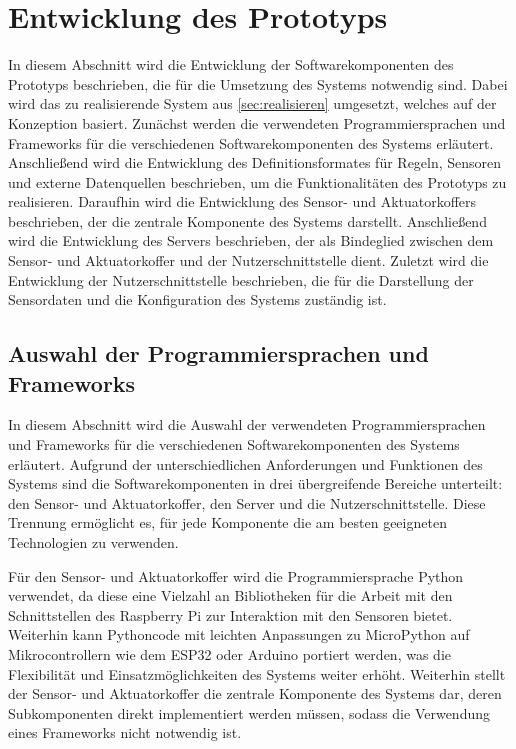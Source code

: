 \section{Entwicklung des Prototyps}\label{sec:programmierung}
In diesem Abschnitt wird die Entwicklung der Softwarekomponenten des Prototyps beschrieben, die für die Umsetzung des Systems notwendig sind.
Dabei wird das zu realisierende System aus \cref{sec:realisieren} umgesetzt, welches auf der Konzeption basiert.
Zunächst werden die verwendeten Programmiersprachen und Frameworks für die verschiedenen Softwarekomponenten des Systems erläutert.
Anschließend wird die Entwicklung des Definitionsformates für Regeln, Sensoren und externe Datenquellen beschrieben, um die Funktionalitäten des Prototyps zu realisieren.
Daraufhin wird die Entwicklung des Sensor- und Aktuatorkoffers beschrieben, der die zentrale Komponente des Systems darstellt.
Anschließend wird die Entwicklung des Servers beschrieben, der als Bindeglied zwischen dem Sensor- und Aktuatorkoffer und der Nutzerschnittstelle dient.
Zuletzt wird die Entwicklung der Nutzerschnittstelle beschrieben, die für die Darstellung der Sensordaten und die Konfiguration des Systems zuständig ist.


\subsection{Auswahl der Programmiersprachen und Frameworks}
In diesem Abschnitt wird die Auswahl der verwendeten Programmiersprachen und Frameworks für die verschiedenen Softwarekomponenten des Systems erläutert.
Aufgrund der unterschiedlichen Anforderungen und Funktionen des Systems sind die Softwarekomponenten in drei übergreifende Bereiche unterteilt: den Sensor- und Aktuatorkoffer, den Server und die Nutzerschnittstelle.
Diese Trennung ermöglicht es, für jede Komponente die am besten geeigneten Technologien zu verwenden.

Für den Sensor- und Aktuatorkoffer wird die Programmiersprache Python verwendet, da diese eine Vielzahl an Bibliotheken für die Arbeit mit den Schnittstellen des Raspberry Pi zur Interaktion mit den Sensoren bietet.
Weiterhin kann Pythoncode mit leichten Anpassungen zu MicroPython auf Mikrocontrollern wie dem ESP32 oder Arduino portiert werden, was die Flexibilität und Einsatzmöglichkeiten des Systems weiter erhöht.
Weiterhin stellt der Sensor- und Aktuatorkoffer die zentrale Komponente des Systems dar, deren Subkomponenten direkt implementiert werden müssen, sodass die Verwendung eines Frameworks nicht notwendig ist.

